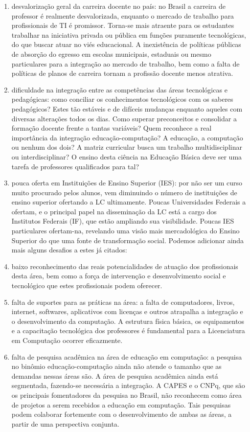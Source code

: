 \begin{enumerate}
	\item desvalorização geral da carreira docente no país: no Brasil a carreira de professor é realmente desvalorizada, enquanto o mercado de trabalho para profissionais de TI é promissor. Torna-se mais atraente para os estudantes trabalhar na iniciativa privada ou pública em funções puramente tecnológicas, do que buscar atuar no viés educacional. A inexistência de políticas públicas de absorção do egresso em escolas municipais, estaduais ou mesmo particulares para a integração ao mercado de trabalho, bem como a falta de políticas de planos de carreira tornam a profissão docente menos atrativa.
	\item dificuldade na integração entre as competências das áreas tecnológicas e pedagógicas: como conciliar os conhecimentos tecnológicos com os saberes pedagógicos? Estes tão estáveis e de difíceis mudanças enquanto aqueles com diversas alterações todos os dias. Como superar preconceitos e  consolidar a formação docente frente a tantas variáveis? Quem reconhece a real importância da integração educação-computação? A educação, a computação ou nenhum dos dois? A matriz curricular busca um trabalho multidisciplinar ou interdisciplinar? O ensino desta ciência na Educação Básica deve ser uma tarefa de professores qualificados para tal?
	\item pouca oferta em Instituições de Ensino Superior (IES): por não ser um curso muito procurado pelos alunos, vem diminuindo o número de instituições de ensino superior ofertando a LC ultimamente. Poucas Universidades Federais a ofertam, e o principal papel na disseminação da LC está a cargo dos Institutos Federais (IF), que estão ampliando sua visibilidade. Poucas IES particulares ofertam-na, revelando uma visão mais mercadológica do Ensino Superior do que uma fonte de transformação social.
	Podemos adicionar ainda mais alguns desafios a estes já citados:
	\item baixo reconhecimento das reais potencialidades de atuação dos profissionais desta área, bem como a força de intervenção e desenvolvimento social e tecnológico que estes profissionais podem oferecer.
	\item falta de suportes para as práticas na área: a falta de computadores, livros, internet, softwares, aplicativos com licenças e outros atrapalha a integração e o desenvolvimento da computação. A estrutura física básica, os equipamentos e a capacitação tecnológica dos professores é fundamental para a Licenciatura em Computação ocorrer eficazmente.
	\item falta de pesquisa acadêmica na área de educação em computação: a pesquisa no binômio educação-computação ainda não atende o tamanho que as demandas nessas áreas são. A área de pesquisa acadêmica ainda está segmentada, fazendo-se necessária a integração. A CAPES e o CNPq, que são os principais fomentadores da pesquisa no Brasil, não reconhecem como área de projetos a serem recebidos a educação em computação. Tais pesquisas podem colaborar fortemente com o desenvolvimento de ambas as áreas, a partir de uma perspectiva conjunta.
	\end{enumerate}
    
